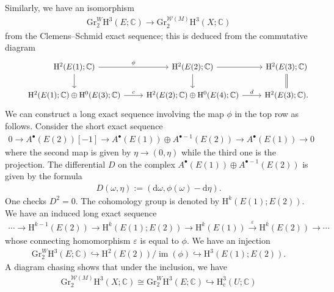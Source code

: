 Similarly, we have an isomorphism
\begin{eqnarray*}
\mathrm{Gr}_{2}^{W}\mathrm{H}^{3}(E;\mathbb{C})
\to \mathrm{Gr}_{2}^{\mathcal{W}(M)}\mathrm{H}^{3}(X;\mathbb{C})
\end{eqnarray*}
from the Clemens--Schmid exact sequence; this is deduced
from the commutative diagram
\begin{eqnarray*} 
\begin{tikzcd}
&\mathrm{H}^{2}(E(1);\mathbb{C})\ar[r,"\phi"]\ar[d]
&\mathrm{H}^{2}(E(2);\mathbb{C})\ar[r]\ar[d]
&\mathrm{H}^{2}(E(3);\mathbb{C})\ar[d,equal]\\
&\mathrm{H}^{2}(E(1);\mathbb{C})\oplus\mathrm{H}^{0}(E(3);\mathbb{C})\ar[r,"c"]
&\mathrm{H}^{2}(E(2);\mathbb{C})\oplus\mathrm{H}^{0}(E(4);\mathbb{C})\ar[r,"d"]
&\mathrm{H}^{2}(E(3);\mathbb{C}).
\end{tikzcd}
\end{eqnarray*}
We can construct a long exact sequence involving the map \(\phi\) in
the top row as follows.
Consider the short exact sequence
\begin{eqnarray*} 
0\to A^{\bullet}(E(2))[-1]\to A^{\bullet}(E(1))
\oplus A^{\bullet-1}(E(2))\to A^{\bullet}(E(1))\to 0
\end{eqnarray*}
where the second map is given by \(\eta\to (0,\eta)\) while
the third one is the projection. The differential \(D\) on the complex
\(A^{\bullet}(E(1))
\oplus A^{\bullet-1}(E(2))\) is given by the formula
\begin{eqnarray*}
D(\omega,\eta):=(\mathrm{d}\omega, \phi(\omega)-\mathrm{d}\eta).
\end{eqnarray*}
One checks \(D^{2}=0\). The cohomology
group is denoted by \(\mathrm{H}^{k}(E(1);E(2))\).
We have an induced long exact sequence
\begin{eqnarray*}
\cdots\to \mathrm{H}^{k-1}(E(2))\to \mathrm{H}^{k}(E(1);E(2))\to 
\mathrm{H}^{k}(E(1))\xrightarrow{\varepsilon}\mathrm{H}^{k}(E(2))\to\cdots
\end{eqnarray*}
whose connecting homomorphism \(\varepsilon\) is equal to \(\phi\).
We have an injection
\begin{eqnarray*}
\mathrm{Gr}_{2}^{W}\mathrm{H}^{3}(E;\mathbb{C})\hookrightarrow
\mathrm{H}^{2}(E(2))\slash\operatorname{im}(\phi) \hookrightarrow\mathrm{H}^{3}(E(1);E(2)).
\end{eqnarray*}
A diagram chasing shows that under the inclusion, we have
\begin{eqnarray*}
\mathrm{Gr}_{2}^{\mathcal{W}(M)}\mathrm{H}^{3}(X;\mathbb{C})
\cong \mathrm{Gr}_{2}^{W}\mathrm{H}^{3}(E;\mathbb{C})\hookrightarrow
\mathrm{H}^{3}_{\mathrm{c}}(U;\mathbb{C})
\end{eqnarray*}
